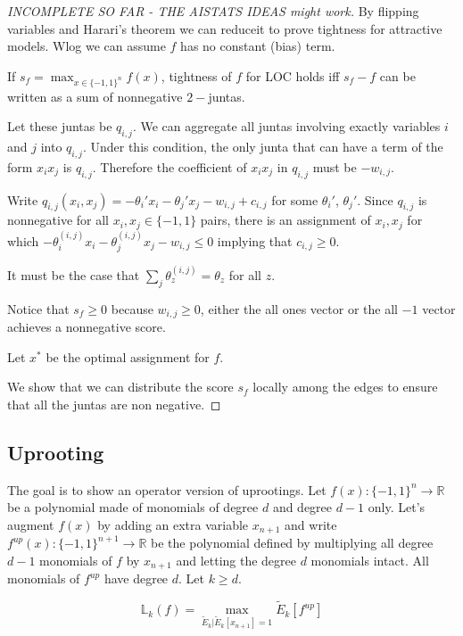 \begin{proof}[INCOMPLETE SO FAR - THE AISTATS IDEAS might work]
By flipping variables and Harari's theorem we can reduceit to prove tightness for attractive models. Wlog we can assume $f$ has no constant (bias) term.

If $s_f = \max_{x \in \{-1,1\}^n} f(x)$, tightness of $f$ for LOC holds iff $s_f - f$ can be written as a sum of nonnegative $2-$juntas. 

Let these juntas be $q_{i,j}$. We can aggregate all juntas involving exactly variables $i$ and $j$ into $q_{i,j}$. Under this condition, the only junta that can have a term of the form $x_ix_j$ is $q_{i,j}$. Therefore the coefficient of $x_ix_j$ in $q_{i,j}$ must be $-w_{i,j}$. 

Write $q_{i,j}(x_i,x_j) = -\theta_i' x_i - \theta_j'x_j - w_{i,j} + c_{i,j}$ for some $\theta_i'$, $\theta_j'$. Since $q_{i,j}$ is nonnegative for all $x_i,x_j \in\{-1,1\}$ pairs, there is an assignment of $x_i, x_j$ for which $-\theta_i^{(i,j)} x_i - \theta_j^{(i,j)} x_j - w_{i,j} \leq 0$ implying that $c_{i,j} \geq 0$.

It must be the case that $\sum_{j} \theta_z^{(i,j)} = \theta_z$ for all $z$.

Notice that $s_f \geq 0$ because $w_{i,j} \geq 0$, either the all ones vector or the all $-1$ vector achieves a nonnegative score. 

Let $x^*$ be the optimal assignment for $f$. 


We show that we can distribute the score $s_f$ locally among the edges to ensure that all the juntas are non negative.
\end{proof}




\subsection{Uprooting}

The goal is to show an operator version of uprootings. Let $f(x) : \{-1,1\}^n \rightarrow \mathbb{R}$ be a polynomial made of monomials of degree $d$ and degree $d-1$ only. Let's augment $f(x)$ by adding an extra variable $x_{n+1}$ and write $f^{up}(x) : \{-1,1\}^{n+1} \rightarrow \mathbb{R}$ be the polynomial defined by multiplying all degree $d-1$ monomials of $f$ by $x_{n+1}$ and letting the degree $d$ monomials intact. All monomials of $f^{up}$ have degree $d$. Let $k \geq d$.

\begin{lemma}
\begin{equation}
\mathbb{L}_k(f) = \max_{\tilde{E}_k | \tilde{E}_k[x_{n+1}] = 1 } \tilde{E}_k[f^{up}]
\end{equation}
\end{lemma}

